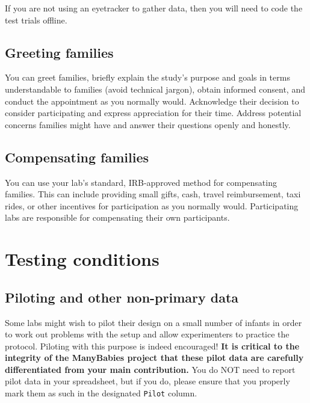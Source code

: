\documentclass[
  letterpaper,
  DIV=11,
  numbers=noendperiod,
  oneside]{scrreprt}
\begin{document}
If you are not using an eyetracker to gather data, then you will need to
code the test trials offline.

\section{Greeting families}\label{greeting-families}

You can greet families, briefly explain the study's purpose and goals in
terms understandable to families (avoid technical jargon), obtain
informed consent, and conduct the appointment as you normally would.
Acknowledge their decision to consider participating and express
appreciation for their time. Address potential concerns families might
have and answer their questions openly and honestly.

\section{Compensating families}\label{compensating-families}

You can use your lab's standard, IRB-approved method for compensating
families. This can include providing small gifts, cash, travel
reimbursement, taxi rides, or other incentives for participation as you
normally would. Participating labs are responsible for compensating
their own participants.

\chapter{Testing conditions}\label{sec-test-conditions}

\section{Piloting and other non-primary
data}\label{piloting-and-other-non-primary-data}

Some labs might wish to pilot their design on a small number of infants
in order to work out problems with the setup and allow experimenters to
practice the protocol. Piloting with this purpose is indeed encouraged!
\textbf{It is critical to the integrity of the ManyBabies project that
these pilot data are carefully differentiated from your main
contribution.} You do NOT need to report pilot data in your spreadsheet,
but if you do, please ensure that you properly mark them as such in the
designated \texttt{Pilot} column.
\end{document}

